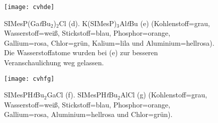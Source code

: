 \begin{figure}[ht!]
	\centering
	\texttt{[image: cvhde]}
	\captionsetup{figurewithin = chapter}
	\captionsetup{font=small, labelfont=bf}\caption[{Abbildung von SIMesP(Ga\textit{t}Bu$_2$)$_2$Cl und K(SIMesP)$_3$Al\textit{t}Bu}]{SIMesP(Ga\textit{t}Bu$_2$)$_2$Cl (d). K(SIMesP)$_3$Al\textit{t}Bu (e) (Kohlenstoff=grau, Wasserstoff=weiß, Stickstoff=blau, Phosphor=orange, Gallium=rosa, Chlor=grün, Kalium=lila und Aluminium=hellrosa). Die Wasserstoffatome wurden bei (e) zur besseren Veranschaulichung weg gelassen.}
\label{abb:cvhde}
\end{figure}

\begin{figure}[ht!]
	\centering
	\texttt{[image: cvhfg]}
	\captionsetup{figurewithin = chapter}
	\captionsetup{font=small, labelfont=bf}\caption[{Abbildung von SIMesPH\textit{t}Bu$_2$GaCl und SIMesPH\textit{t}Bu$_2$AlCl}]{SIMesPH\textit{t}Bu$_2$GaCl (f). SIMesPH\textit{t}Bu$_2$AlCl (g) (Kohlenstoff=grau, Wasserstoff=weiß, Stickstoff=blau, Phosphor=orange, Gallium=rosa, Aluminium=hellrosa und Chlor=grün).}
\label{abb:cvhfg}
\end{figure}


%
%

